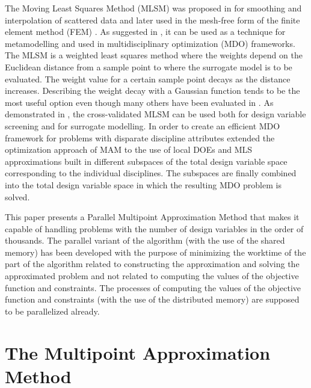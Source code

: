 \documentclass[runningheads,a4paper]{llncs}
\begin{document}
The Moving Least Squares Method (MLSM) was proposed in \cite{LancasterSalkauskas1981} for smoothing and interpolation of scattered data and later used in the mesh-free form of the finite element method (FEM) \cite{Liszka1984}. As suggested in \cite{ChoiYounYang2001}, it can be used as a technique for metamodelling and used in multidisciplinary optimization (MDO) frameworks. The MLSM is a weighted least squares method where the weights depend on the Euclidean distance from a sample point to where the surrogate model is to be evaluated. The weight value for a certain sample point decays as the distance increases. Describing the weight decay with a Gaussian function tends to be the most useful option even though many others have been evaluated in \cite{ToropovSchrammSahaiJones2005}. As demonstrated in \cite{PolynkinToropov2010}, the cross-validated MLSM can be used both for design variable screening and for surrogate modelling. In order to create an efficient MDO framework for problems with disparate discipline attributes \cite{OllarToropovJones2014} extended the optimization approach of MAM to the use of local DOEs and MLS approximations built in different subspaces of the total design variable space corresponding to the individual disciplines. The subspaces are finally combined into the total design variable space in which the resulting MDO problem is solved.

This paper presents a Parallel Multipoint Approximation Method that makes it capable of handling problems with the number of design variables in the order of thousands. The parallel variant of the algorithm (with the use of the shared memory) has been developed with the purpose of minimizing the worktime of the part of the algorithm related to constructing the approximation and solving the approximated problem and not related to computing the values of the objective function and  constraints. The processes of computing the values of the objective function and constraints (with the use of the 
distributed memory) are supposed to be parallelized already.

\section{The Multipoint Approximation Method}
\label{sec:MAM}
\end{document}
